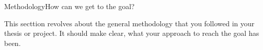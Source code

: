 \begin{frame}[t]{Methodology}{How can we get to the goal?}

  This secttion revolves about the general methodology that you
  followed in your thesis or project. It should make clear, what your
  approach to reach the goal has been.

\end{frame}
